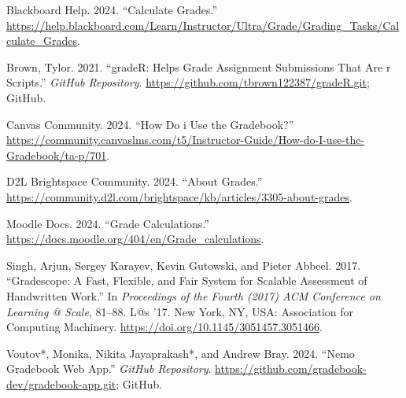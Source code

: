 \documentclass[10pt,a4paper,onecolumn]{article}
\newlength{\cslhangindent}
\newenvironment{CSLReferences}[2] %
 {\begin{list}{}{%
  \setlength{\itemindent}{0pt}
  \setlength{\leftmargin}{0pt}
  \setlength{\parsep}{0pt}
  \ifodd #1
   \setlength{\leftmargin}{\cslhangindent}
   \setlength{\itemindent}{-1\cslhangindent}
  \fi
  \setlength{\itemsep}{#2\baselineskip}}}
 {\end{list}}
\begin{document}
\label{refs}
\begin{CSLReferences}{1}{0}
Blackboard Help. 2024. {``Calculate Grades.''}
\url{https://help.blackboard.com/Learn/Instructor/Ultra/Grade/Grading_Tasks/Calculate_Grades}.

Brown, Tylor. 2021. {``gradeR: Helps Grade Assignment Submissions That
Are r Scripts.''} \emph{GitHub Repository}.
\url{https://github.com/tbrown122387/gradeR.git}; GitHub.

Canvas Community. 2024. {``How Do i Use the Gradebook?''}
\url{https://community.canvaslms.com/t5/Instructor-Guide/How-do-I-use-the-Gradebook/ta-p/701}.

D2L Brightspace Community. 2024. {``About Grades.''}
\url{https://community.d2l.com/brightspace/kb/articles/3305-about-grades}.

Moodle Docs. 2024. {``Grade Calculations.''}
\url{https://docs.moodle.org/404/en/Grade_calculations}.

Singh, Arjun, Sergey Karayev, Kevin Gutowski, and Pieter Abbeel. 2017.
{``Gradescope: A Fast, Flexible, and Fair System for Scalable Assessment
of Handwritten Work.''} In \emph{Proceedings of the Fourth (2017) ACM
Conference on Learning @ Scale}, 81--88. L@s '17. New York, NY, USA:
Association for Computing Machinery.
\url{https://doi.org/10.1145/3051457.3051466}.

Voutov*, Monika, Nikita Jayaprakash*, and Andrew Bray. 2024. {``Nemo
Gradebook Web App.''} \emph{GitHub Repository}.
\url{https://github.com/gradebook-dev/gradebook-app.git}; GitHub.

\end{CSLReferences}
\end{document}
